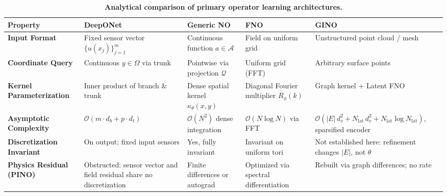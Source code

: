 \begin{table}[htbp]
\centering
\small
\caption{\textbf{Analytical comparison of primary operator learning architectures.}}
\label{tab:comparison}
\begin{tabularx}{\textwidth}{l>{\raggedright\arraybackslash}X>{\raggedright\arraybackslash}X>{\raggedright\arraybackslash}X>{\raggedright\arraybackslash}X}
\toprule
\textbf{Property} & \textbf{DeepONet \cite{lu2021learning}} & \textbf{Generic NO \cite{kovachki2023neural}} & \textbf{FNO \cite{li2021fourier}} & \textbf{GINO \cite{li2023geometry}} \\
\midrule
\textbf{Input Format} & Fixed sensor vector $\{u(x_j)\}_{j=1}^m$ & Continuous function $a \in \mathcal{A}$ & Field on uniform grid & Unstructured point cloud / mesh \\
\textbf{Coordinate Query} & Continuous $y \in \Omega$ via trunk & Pointwise via projection $\mathcal{Q}$ & Uniform grid (FFT) & Arbitrary surface points \\
\textbf{Kernel Parameterization} & Inner product of branch \& trunk & Dense spatial kernel $\kappa_\theta(x, y)$ & Diagonal Fourier multiplier $R_\phi(k)$ & Graph kernel + Latent FNO \\
\textbf{Asymptotic Complexity} & $\mathcal{O}(m \cdot d_b + p \cdot d_t)$ & $\mathcal{O}(N^2)$ dense integration & $\mathcal{O}(N \log N)$ via FFT & $\mathcal{O}(|E|\,d_v^{2} + N_{\text{lat}}\,d_v^{2} + N_{\text{lat}} \log N_{\text{lat}})$, sparsified encoder \\
\textbf{Discretization Invariant} & On output; fixed input sensors & Yes, fully invariant & Invariant on uniform tori & Not established here: refinement changes $|E|$, not $\theta$ \\
\textbf{Physics Residual (PINO)} & Obstructed: sensor vector and field residual share no discretization & Finite differences or autograd & Optimized via spectral differentiation & Rebuilt via graph differences; no rate \\
\bottomrule
\end{tabularx}
\end{table}

